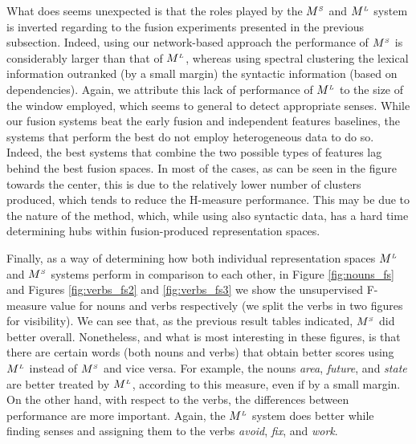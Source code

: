 What does seems unexpected is that the roles played by the $M^{\scriptscriptstyle S}$ and $M^{\scriptscriptstyle L}$ system is inverted regarding to the fusion experiments presented in the previous subsection. Indeed, using our network-based approach the performance of $M^{\scriptscriptstyle S}$ is considerably larger than that of $M^{\scriptscriptstyle L}$, whereas using spectral clustering the lexical information outranked (by a small margin) the syntactic information (based on dependencies). Again, we attribute this lack of performance of $M^{\scriptscriptstyle L}$ to the size of the window employed, which seems to general to detect appropriate senses. While our fusion systems beat the early fusion and independent features baselines, the systems that perform the best do not employ heterogeneous data to do so. Indeed, the best systems that combine the two possible types of features lag behind the best fusion spaces. In most of the cases, as can be seen in the figure towards the center, this is due to the relatively lower number of clusters produced, which tends to reduce the H-measure performance. This may be due to the nature of the method, which, while using also syntactic data, has a hard time determining hubs within fusion-produced representation spaces. 


 
Finally, as a way of determining how both individual representation spaces $M^{\scriptscriptstyle L}$ and $M^{\scriptscriptstyle S}$ systems perform in comparison to each other, in Figure \ref{fig:nouns_fs} and Figures  \ref{fig:verbs_fs2} and \ref{fig:verbs_fs3} we show the unsupervised F-measure value for nouns and verbs respectively (we split the verbs in two figures for visibility). We can see that, as the previous result tables indicated, $M^{\scriptscriptstyle S}$ did better overall. Nonetheless, and what is most interesting in these figures, is that there are certain words (both nouns and verbs) that obtain better scores using $M^{\scriptscriptstyle L}$ instead of $M^{\scriptscriptstyle S}$ and vice versa. For example, the nouns \textit{area}, \textit{future}, and \textit{state} are better treated by $M^{\scriptscriptstyle L}$, according to this measure, even if by a small margin. On the other hand, with respect to the verbs, the differences between performance are more important. Again, the $M^{\scriptscriptstyle L}$ system does better while finding senses and assigning them to the verbs \textit{avoid}, \textit{fix}, and \textit{work}. %

 




